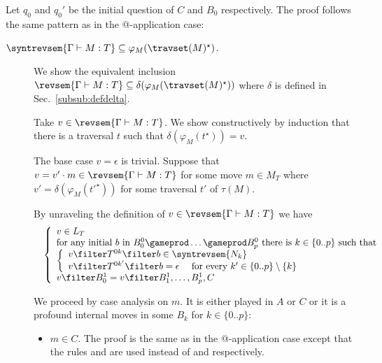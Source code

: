 \begin{itemize}[$\bullet$]
    Let $q_0$ and $q_0'$ be the initial
    question of $C$ and $B_0$ respectively.
    The proof follows the same pattern as in the @-application case:
    \begin{description}
        \item[$\syntrevsem{\Gamma \vdash M : T} \subseteq \varphi_{M}( \travset(M)^\star )$.] We show the equivalent inclusion $\revsem{\Gamma \vdash M : T} \subseteq \delta (\varphi_{M}( \travset(M)^\star ))$
            where $\delta$ is defined in Sec.\ \ref{subsub:defdelta}.

     Take $v \in \revsem{\Gamma \vdash M : T}$. We show constructively by induction that there is a traversal $t$ such that $\delta(\varphi_M(t^\star)) = v$.

    The base case $v=\epsilon$ is trivial. Suppose that $v = v' \cdot m \in \revsem{\Gamma \vdash M : T}$ for some move $m \in M_T$ where $v' = \delta(\varphi_M(t'^\star))$ for some traversal $t'$ of $\tau(M)$.

    By unraveling the definition of $v \in \revsem{\Gamma \vdash M : T}$ we have
    \begin{eqnarray*}
    && \left\{
    \begin{array}{ll}
        v \in L_T \\
        \hbox{for any initial $b$ in $B_0^0 \gameprod \ldots \gameprod B_p^0$ there is $k \in \{0..p\}$ such that } \\
        \left\{\begin{array}{ll}
            v \filter T^{0k} \filter b  \in \syntrevsem{N_k} \\
            v \filter T^{0k'} \filter b  = \epsilon \quad \mbox{ for every } k'\in \{0..p\}\setminus\{k\}
        \end{array}
        \right. \\
        v \filter B^1_0 = v \filter B^1_1, \ldots, B^1_p, C
    \end{array}
    \right.
    \end{eqnarray*}


    We proceed by case analysis on $m$. It is either played in $A$ or $C$ or it is a profound internal moves in some $B_k$ for $k\in \{0..p\}$:

        \begin{itemize}
            \item $m\in C$. The proof is the same as in the @-application case except that the rules  and  are used instead of  and  respectively.



\end{itemize}
\end{description}
\end{itemize}
